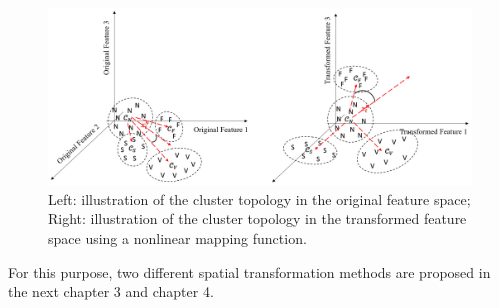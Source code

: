\begin{figure}[b]
\centering
\includegraphics[scale=.5]{Fig/topo1.png}
\caption{Left: illustration of the cluster topology in the original feature space; Right: illustration of the cluster topology in the transformed feature space using a nonlinear mapping function.}
\label{fig:topo1}
\end{figure}

For this purpose, two different spatial transformation methods are proposed in the next chapter 3 and chapter 4.

